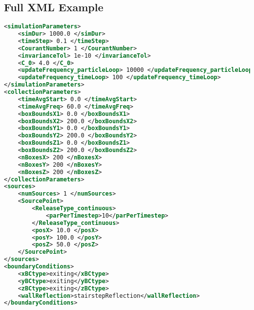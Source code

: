 \subsection{Full XML Example}
\begin{lstlisting}[language=XML]
<simulationParameters>
    <simDur> 1000.0 </simDur>
    <timeStep> 0.1 </timeStep>
    <CourantNumber> 1 </CourantNumber> 
    <invarianceTol> 1e-10 </invarianceTol>
    <C_0> 4.0 </C_0>
    <updateFrequency_particleLoop> 10000 </updateFrequency_particleLoop>
    <updateFrequency_timeLoop> 100 </updateFrequency_timeLoop>
</simulationParameters>
<collectionParameters>
    <timeAvgStart> 0.0 </timeAvgStart>
    <timeAvgFreq> 60.0 </timeAvgFreq>
    <boxBoundsX1> 0.0 </boxBoundsX1>
    <boxBoundsX2> 200.0 </boxBoundsX2>
    <boxBoundsY1> 0.0 </boxBoundsY1>
    <boxBoundsY2> 200.0 </boxBoundsY2>
    <boxBoundsZ1> 0.0 </boxBoundsZ1>
    <boxBoundsZ2> 200.0 </boxBoundsZ2>
    <nBoxesX> 200 </nBoxesX>
    <nBoxesY> 200 </nBoxesY>
    <nBoxesZ> 200 </nBoxesZ>
</collectionParameters>
<sources>
    <numSources> 1 </numSources>
    <SourcePoint>
        <ReleaseType_continuous>
            <parPerTimestep>10</parPerTimestep>
        </ReleaseType_continuous>
        <posX> 10.0 </posX>
        <posY> 100.0 </posY>
        <posZ> 50.0 </posZ>
  	</SourcePoint>
</sources>
<boundaryConditions>
    <xBCtype>exiting</xBCtype>
    <yBCtype>exiting</yBCtype>
    <zBCtype>exiting</zBCtype>
    <wallReflection>stairstepReflection</wallReflection>
</boundaryConditions>
\end{lstlisting}
